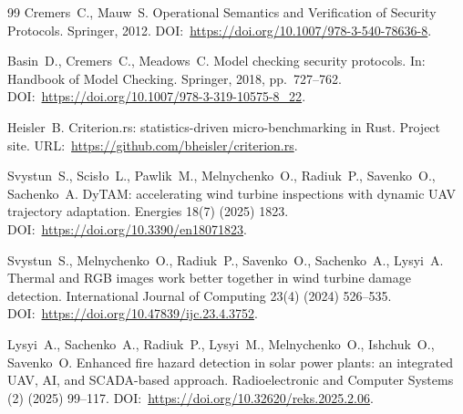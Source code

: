\documentclass[preprint,12pt]{elsarticle}
\theoremstyle{remark}
\begin{document}
\begin{thebibliography}{99}
Cremers~C., Mauw~S.
Operational Semantics and Verification of Security Protocols.
Springer, 2012.
DOI:~\url{https://doi.org/10.1007/978-3-540-78636-8}.

Basin~D., Cremers~C., Meadows~C.
Model checking security protocols.
In: Handbook of Model Checking. Springer, 2018, pp.~727--762.
DOI:~\url{https://doi.org/10.1007/978-3-319-10575-8_22}.

Heisler~B.
Criterion.rs: statistics-driven micro-benchmarking in Rust.
Project site.
URL:~\url{https://github.com/bheisler/criterion.rs}.

Svystun~S., Scis{\l}o~L., Pawlik~M., Melnychenko~O., Radiuk~P., Savenko~O., Sachenko~A.
DyTAM: accelerating wind turbine inspections with dynamic UAV trajectory adaptation.
Energies 18(7) (2025) 1823.
DOI:~\url{https://doi.org/10.3390/en18071823}.

Svystun~S., Melnychenko~O., Radiuk~P., Savenko~O., Sachenko~A., Lysyi~A.
Thermal and RGB images work better together in wind turbine damage detection.
International Journal of Computing 23(4) (2024) 526--535.
DOI:~\url{https://doi.org/10.47839/ijc.23.4.3752}.

Lysyi~A., Sachenko~A., Radiuk~P., Lysyi~M., Melnychenko~O., Ishchuk~O., Savenko~O.
Enhanced fire hazard detection in solar power plants: an integrated UAV, AI, and SCADA-based approach.
Radioelectronic and Computer Systems (2) (2025) 99--117.
DOI:~\url{https://doi.org/10.32620/reks.2025.2.06}.

\end{thebibliography}
\end{document}
